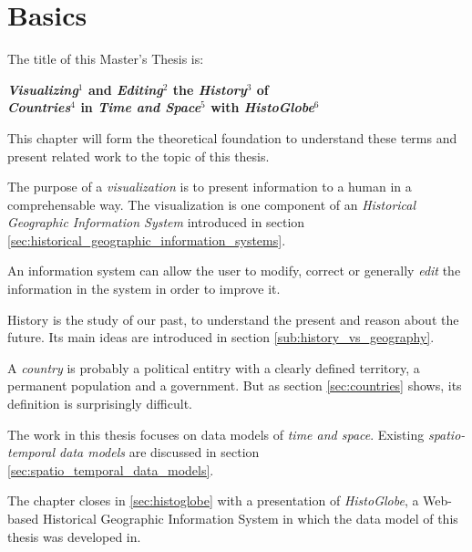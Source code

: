 

\chapter{Basics} %
\label{cha:basics}

The title of this Master's Thesis is:

\vspace{-1em}
\begin{large}
\begin{center}
  \textbf{
    \emph{Visualizing}$^1$ and \emph{Editing}$^2$ the \emph{History}$^3$ of\\
    \emph{Countries}$^4$ in \emph{Time and Space}$^5$ with \emph{HistoGlobe}$^6$
  }
\end{center}
\end{large}

This chapter will form the theoretical foundation to understand these terms and present related work to the topic of this thesis.

\begin{description}[labelindent=1.53em]
  \item[$^1$] The purpose of a \emph{visualization} is to present information to a human in a comprehensable way. The visualization is one component of an \emph{Historical Geographic Information System} introduced in section \ref{sec:historical_geographic_information_systems}.
  \item[$^2$] An information system can allow the user to modify, correct or generally \emph{edit} the information in the system in order to improve it.
  \item[$^3$] History is the study of our past, to understand the present and reason about the future. Its main ideas are introduced in section \ref{sub:history_vs_geography}.
  \item[$^4$] A \emph{country} is probably a political entitry with a clearly defined territory, a permanent population and a government. But as section \ref{sec:countries} shows, its definition is surprisingly difficult.
  \item[$^5$] The work in this thesis focuses on data models of \emph{time and space}. Existing \emph{spatio-temporal data models} are discussed in section \ref{sec:spatio_temporal_data_models}.
  \item[$^6$] The chapter closes in \ref{sec:histoglobe} with a presentation of \emph{HistoGlobe}, a Web-based Historical Geographic Information System in which the data model of this thesis was developed in.
\end{description}

